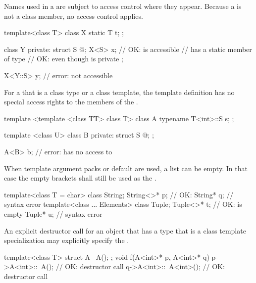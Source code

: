 \pnum
\begin{note}
Names used in a 
are subject to access control where they appear.
Because a  is not a class member,
no access control applies.
\end{note}
\begin{example}
\begin{codeblock}
template<class T> class X {
  static T t;
};

class Y {
private:
  struct S { @\commentellip@ };
  X<S> x;           // OK:  is accessible
                    //  has a static member of type 
                    // OK: even though  is private
};

X<Y::S> y;          // error:  not accessible
\end{codeblock}
\end{example}
For a
that is a class type or a class template, the template
definition has no special access rights to the
members of the .
\begin{example}
\begin{codeblock}
template <template <class TT> class T> class A {
  typename T<int>::S s;
};

template <class U> class B {
private:
  struct S { @\commentellip@ };
};

A<B> b;             // error:  has no access to 
\end{codeblock}
\end{example}

\pnum
When template argument packs or default
are used, a
list can be empty.
In that case the empty
\tcode{<>}
brackets shall still be used as the
.
\begin{example}
\begin{codeblock}
template<class T = char> class String;
String<>* p;                    // OK: 
String* q;                      // syntax error
template<class ... Elements> class Tuple;
Tuple<>* t;                     // OK:  is empty
Tuple* u;                       // syntax error
\end{codeblock}
\end{example}

\pnum
An explicit destructor call for an object that has a type
that is a class template specialization may explicitly specify the
.
\begin{example}
\begin{codeblock}
template<class T> struct A {
  ~A();
};
void f(A<int>* p, A<int>* q) {
  p->A<int>::~A();              // OK: destructor call
  q->A<int>::~A<int>();         // OK: destructor call
}
\end{codeblock}
\end{example}

